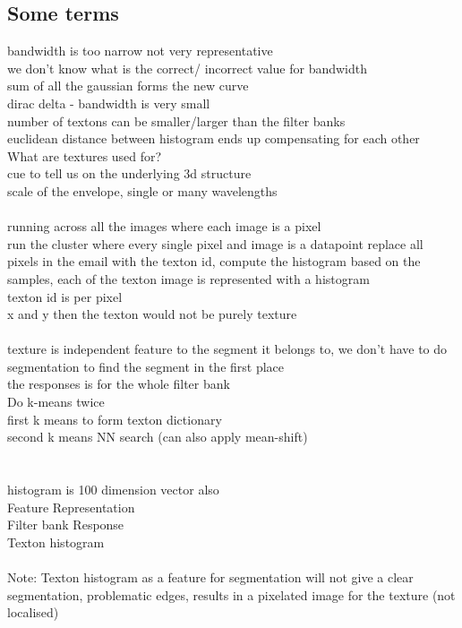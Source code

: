 \documentclass[11pt]{article}
\begin{document}
\subsection*{Some terms}
bandwidth is too narrow not very representative
\\
we don't know what is the correct/ incorrect value for bandwidth
\\
sum of all the gaussian forms the new curve
\\
dirac delta - bandwidth is very small
\\
number of textons can be smaller/larger than the filter banks
\\
euclidean distance between histogram ends up compensating for each other
\\
What are textures used for?\\
cue to tell us on the underlying 3d structure
\\
scale of the envelope, single or many wavelengths\\
\\
running across all the images where each image is a pixel
\\run the cluster where every single pixel and image is a datapoint
replace all pixels in the email with the texton id, compute the histogram based on the samples, each of the texton image is represented with a histogram
\\
texton id is per pixel
\\
x and y then the texton would not be purely texture
\\\\
texture is independent feature to the segment it belongs to, we don't have to do segmentation to find the segment in the first place
\\
the responses is for the whole filter bank
\\
Do k-means twice\\
first k means to form texton dictionary\\
second k means NN search (can also apply mean-shift)\\
\\
\\histogram is 100 dimension vector also
\\
Feature Representation\\
Filter bank Response\\
Texton histogram\\
\\
Note: Texton histogram as a feature for segmentation will not give a clear segmentation, problematic edges, results in a pixelated image for the texture (not localised)\\
\end{document}
